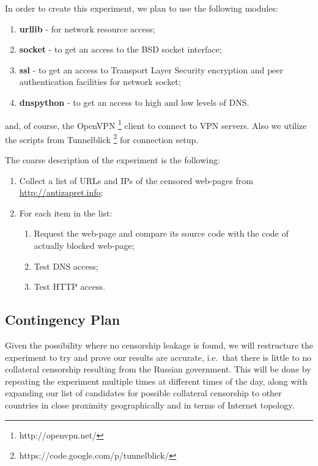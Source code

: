 \documentclass[conference]{IEEEtran}
\begin{document}
In order to create this experiment, we plan to use the following modules:
\begin{enumerate}
\item \textbf{urllib} - for network resource access;
\item \textbf{socket} - to get an access to the BSD socket interface;
\item \textbf{ssl} - to get an access to Transport Layer Security encryption and peer authentication facilities for network socket;
\item \textbf{dnspython} - to get an access to high and low levels of DNS. 
\end{enumerate}
and, of course, the OpenVPN \footnote{http://openvpn.net/} client to connect to VPN servers. Also we utilize the scripts from Tunnelblick \footnote{https://code.google.com/p/tunnelblick/} for connection setup.

The coarse description of the experiment is the following:
\begin{enumerate}
\item Collect a list of URLs and IPs of the censored web-pages from \url{http://antizapret.info};
\item For each item in the list:
    \begin{enumerate}
    \item Request the web-page and compare its source code with the code of actually blocked web-page;
    \item Test DNS access;
    \item Test HTTP access.
    \end{enumerate}
\end{enumerate}

\subsection{Contingency Plan}
Given the possibility where no censorship leakage is found, we will restructure the experiment to try and prove our results are accurate, i.e.\  that there is little to no collateral censorship resulting from the Russian government. 
This will be done by repeating the experiment multiple times at different times of the day, along with expanding our list of candidates for possible collateral censorship to other countries in close proximity geographically and in terms of Internet topology. 
\end{document}
